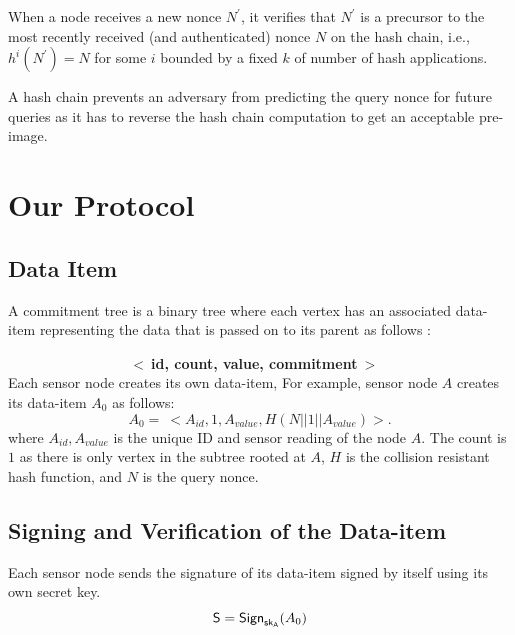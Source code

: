 \documentclass[%
  slidesonly,%
  semlayer%
  ]{seminar}                                  %
\newcommand{\sk}{\sf{sk}}
\begin{document}
\begin{slide}
      When a node receives a new nonce $N^{'}$, it verifies that $N^{'}$ is a precursor to the most recently received (and authenticated) nonce $N$ on the hash chain, i.e., $h^{i}(N^{'}) = N$ for some $i$ bounded by a fixed $k$ of number of hash applications.  
      
      A hash chain prevents an adversary from predicting the query nonce for future queries as it has to reverse the hash chain computation to get an acceptable pre-image.
      \clearpage

\section*{Our Protocol}
    
    \subsection*{Data Item}
        A commitment tree is a binary tree where each vertex has an associated data-item representing the data that is passed on to its parent as follows :

        $\hspace{100pt}$ \textbf{$<\ $id, count, value, commitment$\ >$}\\
  
      Each sensor node creates its own data-item, For example, sensor node $A$ creates its data-item $A_{0}$ as follows:
      \begin{equation}
        \label{eq:data-item}
        A_{0} =\ <A_{id}, 1, A_{value}, H(N||1||A_{value})>.
      \end{equation}
      where $A_{id}, A_{value}$ is the unique ID and sensor reading of the node $A$. 
      The count is $1$ as there is only vertex in the subtree rooted at $A$, $H$ is the collision resistant hash function, and $N$ is the query nonce.
    \clearpage

    \subsection*{Signing and Verification of the Data-item}
      Each sensor node sends the signature of its data-item signed by itself using its own secret key. 
        \begin{equation}
          \textsf{S} = \textsf{Sign}_{\sk_{A}}(A_{0})
        \end{equation}


\end{slide}
\end{document}
